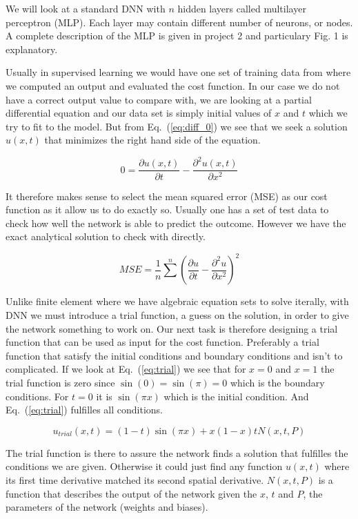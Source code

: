 \documentclass[a4paper, twocolumn]{article}
\newcommand{\eq} [1]{Eq.\ (\ref{eq:#1})}
\begin{document}
We will look at a standard DNN with $n$ hidden layers called multilayer perceptron (MLP). Each layer may contain different number of neurons, or nodes. A complete description of the MLP is given in project 2 and particulary Fig. 1 is explanatory.   

Usually in supervised learning we would have one set of training data from where we computed an output and evaluated the cost function. In our case we do not have a correct output value to compare with, we are looking at a partial differential equation and our data set is simply initial values of $x$ and $t$ which we try to fit to the model. But from \eq{diff_0} we see that we seek a solution $u(x,t)$ that minimizes the right hand side of the equation. 

\begin{equation} \label{eq:diff_0}
0 = \frac{\partial u(x,t)}{\partial t} - \frac{\partial^2 u(x,t)}{\partial x^2} 
\end{equation}

It therefore makes sense to select the mean squared error (MSE) as our cost function as it allow us to do exactly so. Usually one has a set of test data to check how well the network is able to predict the outcome. However we have the exact analytical solution to check with directly.

\begin{equation}
MSE = \frac{1}{n} \sum^n \left( \frac{\partial u}{\partial t} - \frac{\partial^2 u}{\partial x^2} \right)^2
\end{equation}

Unlike finite element where we have algebraic equation sets to solve iterally, with DNN we must introduce a trial function, a guess on the solution, in order to give the network something to work on. 
Our next task is therefore designing a trial function that can be used as input for the cost function. Preferably a trial function that satisfy the initial conditions and boundary conditions and isn't to complicated. If we look at \eq{trial} we see that for $x = 0$ and $x = 1$ the trial function is zero since $\sin (0) = \sin (\pi) = 0$ which is the boundary conditions. For $t = 0$ it is $\sin(\pi x)$ which is the initial condition. And \eq{trial} fulfilles all conditions.

\begin{equation} \label{eq:trial}
u_{trial}(x,t) = (1 - t)\sin (\pi x) + x(1 - x)tN(x, t, P)
\end{equation}

The trial function is there to assure the network finds a solution that fulfilles the conditions we are given. Otherwise it could just find any function $u(x,t)$ where its first time derivative matched its second spatial derivative. $N(x,t,P)$ is a function that describes the output of the network given the $x$, $t$ and $P$, the parameters of the network (weights and biases). 
\end{document}
